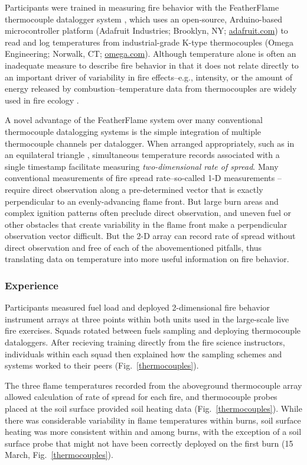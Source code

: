 \documentclass[fire,article,submit,moreauthors,pdftex]{Definitions/mdpi}
\begin{document}
Participants were trained in measuring fire behavior with the FeatherFlame thermocouple datalogger system \citep{mcgranahan2021b}, which uses an open-source, Arduino-based microcontroller platform (Adafruit Industries; Brooklyn, NY; \href{https://adafruit.com}{adafruit.com}) to read and log temperatures from industrial-grade K-type thermocouples (Omega Engineering; Norwalk, CT; \href{https://omega.com}{omega.com}).
Although temperature alone is often an inadequate measure to describe fire behavior in that it does not relate directly to an important driver of variability in fire effects--e.g., intensity, or the amount of energy released by combustion--temperature data from thermocouples are widely used in fire ecology \citep{mcgranahan2020}.

A novel advantage of the FeatherFlame system over many conventional thermocouple datalogging systems is the simple integration of multiple thermocouple channels per datalogger.
When arranged appropriately, such as in an equilateral triangle \citep{simard1984}, simultaneous temperature records associated with a single timestamp facilitate measuring \emph{two-dimensional rate of spread}.
Many conventional measurements of fire spread rate--so-called 1-D measurements \citep{finney2021}--require direct observation along a pre-determined vector that is exactly perpendicular to an evenly-advancing flame front.
But large burn areas and complex ignition patterns often preclude direct observation, and uneven fuel or other obstacles that create variability in the flame front make a perpendicular observation vector difficult.
But the 2-D array can record rate of spread without direct observation and free of each of the abovementioned pitfalls, thus translating data on temperature into more useful information on fire behavior.

\subsubsection{Experience}

Participants measured fuel load and deployed 2-dimensional fire behavior instrument arrays at three points within both units used in the large-scale live fire exercises.
Squads rotated between fuels sampling and deploying thermocouple dataloggers.
After recieving training directly from the fire science instructors, individuals within each squad then explained how the sampling schemes and systems worked to their peers (Fig.~\ref{thermocouples}).

The three flame temperatures recorded from the aboveground thermocouple array allowed calculation of rate of spread for each fire, and thermocouple probes placed at the soil surface provided soil heating data (Fig.~\ref{thermocouples}).
While there was considerable variability in flame temperatures within burns, soil surface heating was more consistent within and among burns, with the exception of a soil surface probe that might not have been correctly deployed on the first burn (15 March, Fig.~\ref{thermocouples}).
\end{document}
